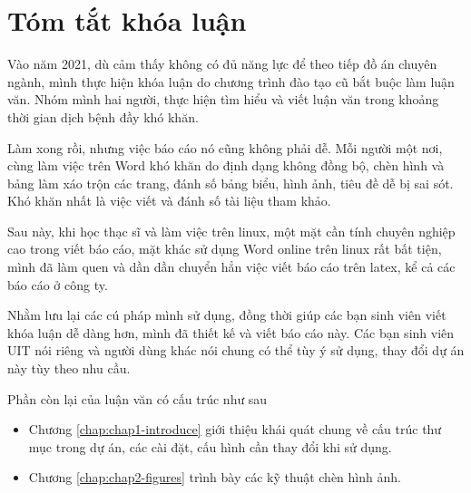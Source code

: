 \chapter*{\centering\Large{Tóm tắt khóa luận}}

Vào năm 2021, dù cảm thấy không có đủ năng lực để theo tiếp đồ án chuyên ngành, mình thực hiện khóa luận do chương trình đào tạo cũ bắt buộc làm luận văn. Nhóm mình hai người, thực hiện tìm hiểu và viết luận văn trong khoảng thời gian dịch bệnh đầy khó khăn.

Làm xong rồi, nhưng việc báo cáo nó cũng không phải dễ. Mỗi người một nơi, cùng làm việc trên Word khó khăn do định dạng không đồng bộ, chèn hình và bảng làm xáo trộn các trang, đánh số bảng biểu, hình ảnh, tiêu đề dễ bị sai sót. Khó khăn nhất là việc viết và đánh số tài liệu tham khảo.

Sau này, khi học thạc sĩ và làm việc trên linux, một mặt cần tính chuyên nghiệp cao trong viết báo cáo, mặt khác sử dụng Word online trên linux rất bất tiện, mình đã làm quen và dần dần chuyển hẳn việc viết báo cáo trên latex, kể cả các báo cáo ở công ty.

Nhằm lưu lại các cú pháp mình sử dụng, đồng thời giúp các bạn sinh viên viết khóa luận dễ dàng hơn, mình đã thiết kế và viết báo cáo này. Các bạn sinh viên UIT nói riêng và người dùng khác nói chung có thể tùy ý sử dụng, thay đổi dự án này tùy theo nhu cầu.

Phần còn lại của luận văn có cấu trúc như sau
\begin{itemize}
    \item Chương \ref{chap:chap1-introduce} giới thiệu khái quát chung về cấu trúc thư mục trong dự án, các cài đặt, cấu hình cần thay đổi khi sử dụng.
    \item Chương \ref{chap:chap2-figures} trình bày các kỹ thuật chèn hình ảnh.
\end{itemize}